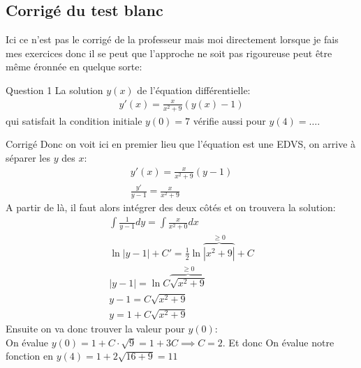 \subsection{Corrigé du test blanc}
Ici ce n'est pas le corrigé de la professeur mais moi directement lorsque je fais mes exercices donc il se peut que l'approche ne soit pas rigoureuse peut être même éronnée en quelque sorte:
\begin{parag}{Question 1}
   La solution $y\left(x\right)$ de l'équation différentielle:
   \begin{align*} y'\left(x\right) = \frac{x}{x^2 + 9}\left(y\left(x\right) - 1\right) \end{align*}
   qui satisfait la condition initiale $y\left(0\right) = 7$ vérifie aussi pour $y\left(4\right) = \ldots$.\\
   \begin{subparag}{Corrigé}
       Donc on voit ici en premier lieu que l'équation est une EDVS, on arrive à séparer les $y$ des $x$:
       \begin{align*} y'\left(x\right) = \frac{x}{x^2 + 9}\left(y - 1\right) \\
       \frac{y'}{y - 1} = \frac{x}{x^2 + 9}
    \end{align*}
       A partir de là, il faut alors intégrer des deux côtés et on trouvera la solution:
       \begin{align*} 
            \int \frac{1}{y - 1} dy = \int \frac{x}{x^2 + 0} dx\\
           \ln \left|y - 1\right| + C' = \frac{1}{2}\ln \overbrace{\left|x^2 + 9\right|}^{\geq 0} + C\\
       \left|y - 1 \right| =  \ln C\overbrace{\sqrt{x^2 + 9}}^{\geq 0} \\
       y - 1 = C\sqrt{x^2 + 9}\\
       y = 1 + C \sqrt{x^2 + 9}
   \end{align*}
   Ensuite on va donc trouver la valeur pour $y\left(0\right)$:\\
   On évalue $y\left(0\right) = 1 + C \cdot \sqrt{9} = 1 + 3C \implies C = 2$. Et donc On évalue notre fonction en $y\left(4\right) = 1 + 2\sqrt{16 + 9} = 11$
   \end{subparag}

    
\end{parag}

